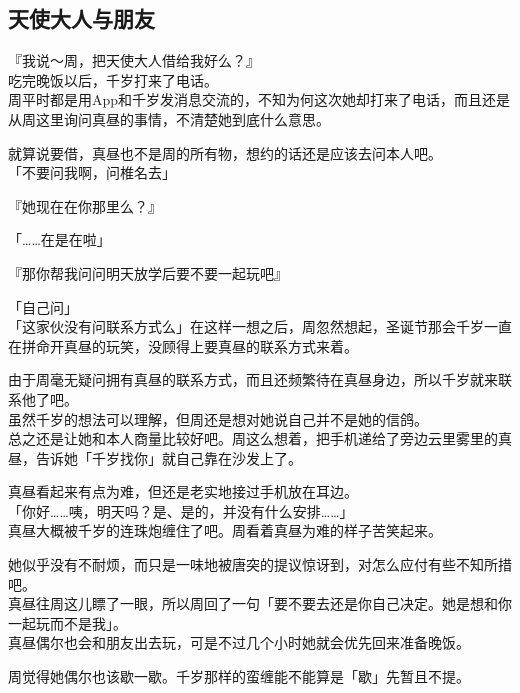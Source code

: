 \subsection{天使大人与朋友}

『我说～周，把天使大人借给我好么？』\\

吃完晚饭以后，千岁打来了电话。\\

周平时都是用App和千岁发消息交流的，不知为何这次她却打来了电话，而且还是从周这里询问真昼的事情，不清楚她到底什么意思。

就算说要借，真昼也不是周的所有物，想约的话还是应该去问本人吧。\\

「不要问我啊，问椎名去」

『她现在在你那里么？』

「……在是在啦」

『那你帮我问问明天放学后要不要一起玩吧』

「自己问」\\

「这家伙没有问联系方式么」在这样一想之后，周忽然想起，圣诞节那会千岁一直在拼命开真昼的玩笑，没顾得上要真昼的联系方式来着。

由于周毫无疑问拥有真昼的联系方式，而且还频繁待在真昼身边，所以千岁就来联系他了吧。\\

虽然千岁的想法可以理解，但周还是想对她说自己并不是她的信鸽。\\

总之还是让她和本人商量比较好吧。周这么想着，把手机递给了旁边云里雾里的真昼，告诉她「千岁找你」就自己靠在沙发上了。

真昼看起来有点为难，但还是老实地接过手机放在耳边。\\

「你好……咦，明天吗？是、是的，并没有什么安排……」\\

真昼大概被千岁的连珠炮缠住了吧。周看着真昼为难的样子苦笑起来。

她似乎没有不耐烦，而只是一味地被唐突的提议惊讶到，对怎么应付有些不知所措吧。\\

真昼往周这儿瞟了一眼，所以周回了一句「要不要去还是你自己决定。她是想和你一起玩而不是我」。\\

真昼偶尔也会和朋友出去玩，可是不过几个小时她就会优先回来准备晚饭。

周觉得她偶尔也该歇一歇。千岁那样的蛮缠能不能算是「歇」先暂且不提。\\


